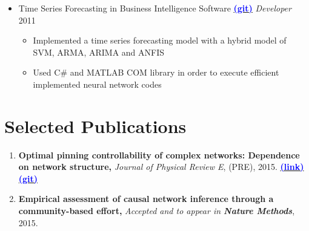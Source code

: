 \documentclass[letter]{res}
\begin{document}
\begin{resume}
\begin{itemize}[leftmargin=-.1in]
			\item Time Series Forecasting in Business Intelligence Software {\href{https://github.com/omid55/time_series_forecasting_business_intelligence}{\textbf{\textcolor{blue}{(git)}}}}
			\newline
			{\sl Developer} \hfill 2011\\
			\vspace{-4mm}
			\iflong
			\begin{itemize}
				\item Implemented a time series forecasting model with a hybrid model of SVM, ARMA, ARIMA and ANFIS
				\item Used C\# and MATLAB COM library in order to execute efficient implemented neural network codes
			\end{itemize}
			\fi
			
		\end{itemize}
		
		
		\section{Selected Publications}
		\begin{enumerate}[leftmargin=-.01in]
			\item \textbf{Optimal pinning controllability of complex networks: Dependence on network structure,} \textit{Journal of Physical Review E}, (PRE), 2015.
			\href{http://link.aps.org/doi/10.1103/PhysRevE.91.012803}{\textbf{\textcolor{blue}{(link)}}}
			{\href{https://github.com/omid55/optimal_pinning_control}{\textbf{\textcolor{blue}{(git)}}}}
			
			\item \textbf{Empirical assessment of causal network inference through a community-based effort,} \textit{Accepted and to appear in \textbf{Nature Methods}}, 2015.
			

\end{enumerate}
\end{resume}
\end{document}
